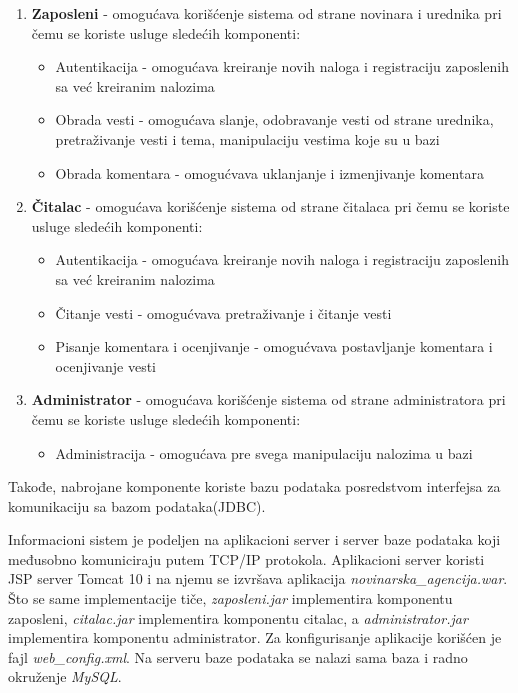 \documentclass{article}
\begin{document}
\begin{enumerate}
    \item \textbf{Zaposleni} - omogućava korišćenje sistema od strane novinara i urednika pri čemu se koriste usluge sledećih komponenti:
        \begin{itemize}
            \item Autentikacija - omogućava kreiranje novih naloga i registraciju zaposlenih sa već kreiranim nalozima
            \item Obrada vesti - omogućava slanje, odobravanje vesti od strane urednika, pretraživanje vesti i tema, manipulaciju vestima koje su u bazi
            \item Obrada komentara - omogućvava uklanjanje i izmenjivanje komentara
        \end{itemize}
    \item \textbf{Čitalac} - omogućava korišćenje sistema od strane čitalaca pri čemu se koriste usluge sledećih komponenti:
        \begin{itemize}
            \item Autentikacija - omogućava kreiranje novih naloga i registraciju zaposlenih sa već kreiranim nalozima
            \item Čitanje vesti - omogućvava pretraživanje i čitanje vesti
            \item Pisanje komentara i ocenjivanje - omogućvava postavljanje komentara i ocenjivanje vesti
        \end{itemize}
    \item \textbf{Administrator} - omogućava korišćenje sistema od strane administratora pri čemu se koriste usluge sledećih komponenti:
        \begin{itemize}
            \item Administracija - omogućava pre svega manipulaciju nalozima u bazi
        \end{itemize}
\end{enumerate}

Takođe, nabrojane komponente koriste bazu podataka posredstvom interfejsa za komunikaciju sa bazom podataka(JDBC).  

\newpage

Informacioni sistem je podeljen na aplikacioni server i server baze podataka koji međusobno komuniciraju putem TCP/IP protokola. Aplikacioni server koristi JSP server Tomcat 10 i na njemu se izvršava aplikacija \textit{novinarska\_agencija.war}.
Što se same implementacije tiče, \textit{zaposleni.jar} implementira komponentu zaposleni, \textit{citalac.jar} implementira komponentu citalac, a \textit{administrator.jar} implementira komponentu administrator. Za konfigurisanje aplikacije korišćen je fajl
\textit{web\_config.xml}. Na serveru baze podataka se nalazi sama baza i radno okruženje \textit{MySQL}. 
\end{document}
